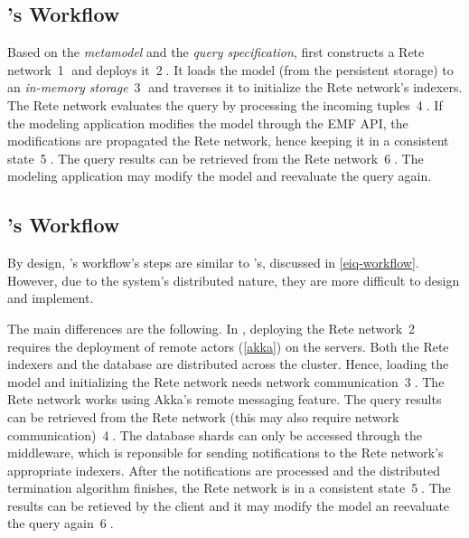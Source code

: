 \subsection{\eiq{}'s Workflow}
\label{eiq-workflow}

Based on the \emph{metamodel} and the \emph{query specification}, \eiq{} first constructs a Rete network~\textcircled{1} and deploys it~\textcircled{2}. It loads the model (from the persistent storage) to an \emph{in-memory storage}~\textcircled{3} and traverses it to initialize the Rete network's indexers. The Rete network evaluates the query by processing the incoming tuples~\textcircled{4}. If the modeling application modifies the model through the EMF API, the modifications are propagated the Rete network, hence keeping it in a consistent state~\textcircled{5}. The query results can be retrieved from the Rete network~\textcircled{6}. The modeling application may modify the model and reevaluate the query again.

\subsection{\iqd{}'s Workflow}
\label{iqd-workflow}

By design, \iqd{}'s workflow's steps are similar to \eiq{}'s, discussed in \autoref{eiq-workflow}. However, due to the system's distributed nature, they are more difficult to design and implement.

The main differences are the following. In \iqd{}, deploying the Rete network~\textcircled{2} requires the deployment of remote actors (\autoref{akka}) on the servers. Both the Rete indexers and the database are distributed across the cluster. Hence, loading the model and initializing the Rete network needs network communication~\textcircled{3}. The Rete network works using Akka's remote messaging feature. The query results can be retrieved from the Rete network (this may also require network communication)~\textcircled{4}. The database shards can only be accessed through the middleware, which is reponsible for sending notifications to the Rete network's appropriate indexers. After the notifications are processed and the distributed termination algorithm finishes, the Rete network is in a consistent state~\textcircled{5}. The results can be retieved by the client and it may modify the model an reevaluate the query again~\textcircled{6}. 




